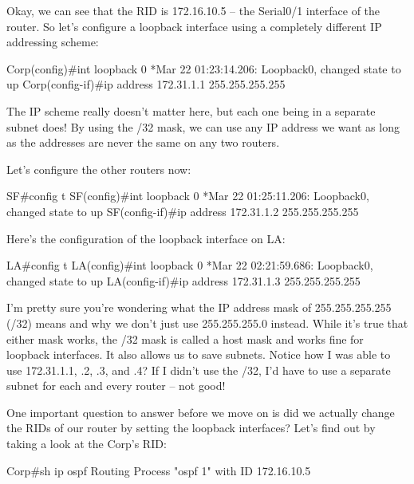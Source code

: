 Okay, we can see that the RID is 172.16.10.5 -- the Serial0/1 interface
of the router. So let's configure a loopback interface using a
completely different IP addressing scheme:

\begin{cli}
Corp(config)#int loopback 0
*Mar 22 01:23:14.206: %
   Loopback0, changed state to up
Corp(config-if)#ip address 172.31.1.1 255.255.255.255
\end{cli}

The IP scheme really doesn't matter here, but each one being in a
separate subnet does! By using the /32 mask, we can use any IP address
we want as long as the addresses are never the same on any two routers.

Let's configure the other routers now:

\begin{cli}
SF#config t
SF(config)#int loopback 0
*Mar 22 01:25:11.206: %
   Loopback0, changed state to up
SF(config-if)#ip address 172.31.1.2 255.255.255.255
\end{cli}

Here's the configuration of the loopback interface on LA:

\begin{cli}
LA#config t
LA(config)#int loopback 0
*Mar 22 02:21:59.686: %
   Loopback0, changed state to up
LA(config-if)#ip address 172.31.1.3 255.255.255.255
\end{cli}

I'm pretty sure you're wondering what the IP address mask of
255.255.255.255 (/32) means and why we don't just use 255.255.255.0
instead. While it's true that either mask works, the /32 mask is called
a host mask and works fine for loopback interfaces. It also allows us to
save subnets. Notice how I was able to use 172.31.1.1, .2, .3, and .4?
If I didn't use the /32, I'd have to use a separate subnet for each and
every router -- not good!

\protect\hypertarget{c18.xhtmlux5cux23Page_764}{}{}One important
question to answer before we move on is did we actually change the RIDs
of our router by setting the loopback interfaces? Let's find out by
taking a look at the Corp's RID:

\begin{cli}
Corp#sh ip ospf
 Routing Process "ospf 1" with ID 172.16.10.5
\end{cli}


